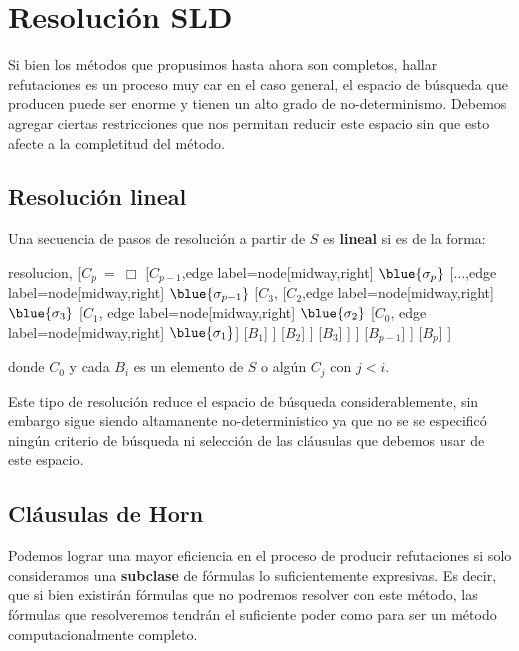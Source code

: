 
\section{Resolución SLD}
Si bien los métodos que propusimos hasta ahora son completos, hallar refutaciones es un proceso muy car en el caso general, el espacio de búsqueda que producen puede ser enorme y tienen un alto grado de no-determinismo. Debemos agregar ciertas restricciones que nos permitan reducir este espacio sin que esto afecte a la completitud del método.

\subsection{Resolución lineal}
Una secuencia de pasos de resolución a partir de $S$ es \textbf{lineal} si es de la forma:

\begin{center}
	\begin{forest} resolucion,
[$C_p~{=}~\Box$ 
	[$C_{p-1}$,edge label={node[midway,right] {$\blue{\sigma_p}$}}
    	[$\dots$,edge label={node[midway,right] {$\blue{\sigma_{p-1}}$}}
        	[$C_3$,
            	[$C_2$,edge label={node[midway,right] {$\blue{\sigma_3}$}}
                	[$C_1$, edge label={node[midway,right] {$\blue{\sigma_2}$}}
           	        	[$C_0$, edge label={node[midway,right] {$\blue{\sigma_1}$}}]
                      	[$B_1$]
                	]
                	[$B_2$]        	
            	]
                [$B_3$]
        	]
    	]
    	[$B_{p-1}$]	
	]
    [$B_p$]
]
	\end{forest}
\end{center}

donde $C_0$ y cada $B_i$ es un elemento de $S$ o algún $C_j$ con $j < i$.

Este tipo de resolución reduce el espacio de búsqueda considerablemente, sin embargo sigue siendo altamanente no-deterministico ya que no se se especificó ningún criterio de búsqueda ni selección de las cláusulas que debemos usar de este espacio.

\subsection{Cláusulas de Horn}
Podemos lograr una mayor eficiencia en el proceso de producir refutaciones si solo consideramos una \textbf{subclase} de fórmulas lo suficientemente expresivas. Es decir, que si bien existirán fórmulas que no podremos resolver con este método, las fórmulas que resolveremos tendrán el suficiente poder como para ser un método computacionalmente completo.

